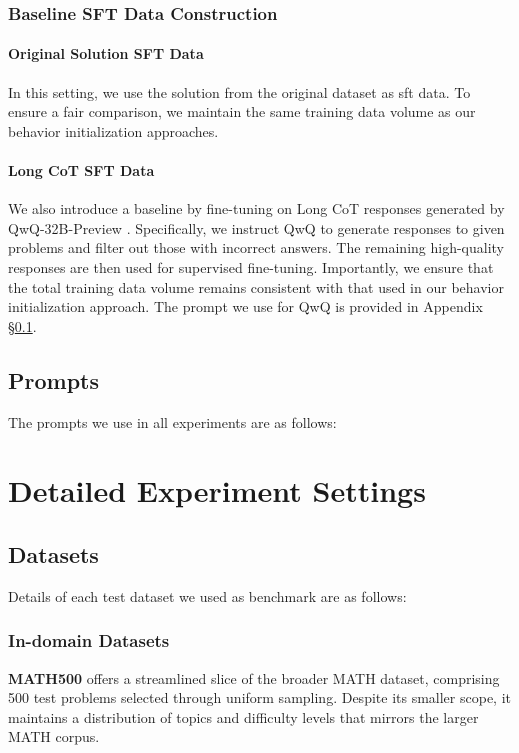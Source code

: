 \subsubsection{Baseline SFT Data Construction}
\label{ap:sft_base}
\paragraph{Original Solution SFT Data}
In this setting, we use the solution from the original dataset as sft data. To ensure a fair comparison, we maintain the same training data volume as our behavior initialization approaches.
\paragraph{Long CoT SFT Data}

We also introduce a baseline by fine-tuning on Long CoT responses generated by QwQ-32B-Preview \cite{qwq-32b-preview}. Specifically, we instruct QwQ to generate responses to given problems and filter out those with incorrect answers. The remaining high-quality responses are then used for supervised fine-tuning. Importantly, we ensure that the total training data volume remains consistent with that used in our behavior initialization approach. The prompt we use for QwQ is provided in Appendix \S\ref{ap:prompts}.



\subsection{Prompts}
\label{ap:prompts}
The prompts we use in all experiments are as follows:


\section{Detailed Experiment Settings}

\subsection{Datasets}
\label{ap:datasets}
Details of each test dataset we used as benchmark are as follows:

\subsubsection{In-domain Datasets}
\textbf{MATH500} \cite{lightman2023lets} offers a streamlined slice of the broader MATH \cite{MATH} dataset, comprising 500 test problems selected through uniform sampling. Despite its smaller scope, it maintains a distribution of topics and difficulty levels that mirrors the larger MATH corpus.

